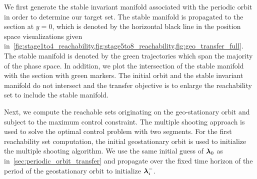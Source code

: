 \documentclass[smallcondensed]{svjour3}
\begin{document}
We first generate the stable invariant manifold associated with the periodic orbit in order to determine our target set.
The stable manifold is propagated to the \Poincare section at \( y = 0 \), which is denoted by the horizontal black line in the position space visualizations given in~\cref{fig:stage1to4_reachability,fig:stage5to8_reachability,fig:geo_transfer_full}.
The stable manifold is denoted by the green trajectories which span the majority of the phase space. 
In addition, we plot the intersection of the stable manifold with the \Poincare section with green markers.
The initial orbit and the stable invariant manifold do not intersect and the transfer objective is to enlarge the reachability set to include the stable manifold.

Next, we compute the reachable sets originating on the geo-stationary orbit and subject to the maximum control constraint. 
The multiple shooting approach is used to solve the optimal control problem with two segments.
For the first reachability set computation, the initial geostationary orbit is used to initialize the multiple shooting algorithm.
We use the same initial guess of \( \bm{\lambda}_0\) as in~\cref{sec:periodic_orbit_transfer} and propagate over the fixed time horizon of the period of the geostationary orbit to initialize \( \bm{\lambda}_i^{-}\).
\end{document}
